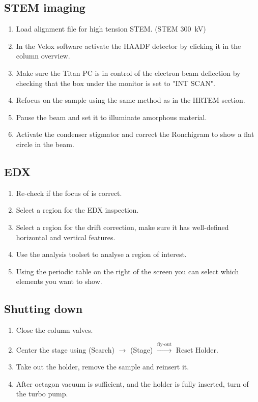 \documentclass[a4paper]{scrartcl}
\begin{document}
\subsection*{STEM imaging}
\begin{enumerate}
    \item Load alignment file for high tension STEM. (STEM \SI{300}{\kilo \volt})
    \item In the Velox software activate the HAADF detector by clicking it in the column overview.
    \item Make sure the Titan PC is in control of the electron beam deflection by checking that the box under the monitor is set to "INT SCAN".
    \item Refocus on the sample using the same method as in the HRTEM section.
    \item Pause the beam and set it to illuminate amorphous material.
    \item Activate the condenser stigmator and correct the Ronchigram to show a flat circle in the beam.
\end{enumerate}

\subsection*{EDX}
\begin{enumerate}
    \item Re-check if the focus of is correct.
    \item Select a region for the EDX inspection.
    \item Select a region for the drift correction, make sure it has well-defined horizontal and vertical features.
    \item Use the analysis toolset to analyse a region of interest.
    \item Using the periodic table on the right of the screen you can select which elements you want to show.
\end{enumerate}

\subsection*{Shutting down}
\begin{enumerate}
    \item Close the column valves.
    \item Center the stage using (Search) $\rightarrow$ (Stage) $\xrightarrow{\text{fly-out}}$ Reset Holder.
    \item Take out the holder, remove the sample and reinsert it.
    \item After octagon vacuum is sufficient, and the holder is fully inserted, turn of the turbo pump.
\end{enumerate}
\end{document}
